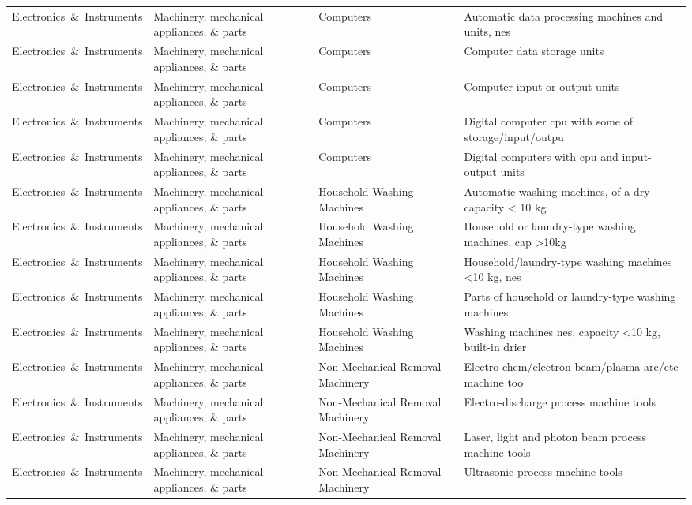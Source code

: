 \begin{appendices}
\begin{xltabular}{\textwidth}{|p{0.14\textwidth}|p{0.28\textwidth}|p{0.18\textwidth}|p{0.30\textwidth}|}
Electronics\ \&\ Instruments & Machinery, mechanical appliances, \& parts & Computers & Automatic data processing machines and units, nes \\
Electronics\ \&\ Instruments & Machinery, mechanical appliances, \& parts & Computers & Computer data storage units \\
Electronics\ \&\ Instruments & Machinery, mechanical appliances, \& parts & Computers & Computer input or output units \\
Electronics\ \&\ Instruments & Machinery, mechanical appliances, \& parts & Computers & Digital computer cpu with some of storage/input/outpu \\
Electronics\ \&\ Instruments & Machinery, mechanical appliances, \& parts & Computers & Digital computers with cpu and input-output units \\
Electronics\ \&\ Instruments & Machinery, mechanical appliances, \& parts & Household Washing Machines & Automatic washing machines, of a dry capacity < 10 kg \\
Electronics\ \&\ Instruments & Machinery, mechanical appliances, \& parts & Household Washing Machines & Household or laundry-type washing machines, cap >10kg \\
Electronics\ \&\ Instruments & Machinery, mechanical appliances, \& parts & Household Washing Machines & Household/laundry-type washing machines <10 kg, nes \\
Electronics\ \&\ Instruments & Machinery, mechanical appliances, \& parts & Household Washing Machines & Parts of household or laundry-type washing machines \\
Electronics\ \&\ Instruments & Machinery, mechanical appliances, \& parts & Household Washing Machines & Washing machines nes, capacity <10 kg, built-in drier \\
Electronics\ \&\ Instruments & Machinery, mechanical appliances, \& parts & Non-Mechanical Removal Machinery & Electro-chem/electron beam/plasma arc/etc machine too \\
Electronics\ \&\ Instruments & Machinery, mechanical appliances, \& parts & Non-Mechanical Removal Machinery & Electro-discharge process machine tools \\
Electronics\ \&\ Instruments & Machinery, mechanical appliances, \& parts & Non-Mechanical Removal Machinery & Laser, light and photon beam process machine tools \\
Electronics\ \&\ Instruments & Machinery, mechanical appliances, \& parts & Non-Mechanical Removal Machinery & Ultrasonic process machine tools \\

\end{xltabular}
\end{appendices}
